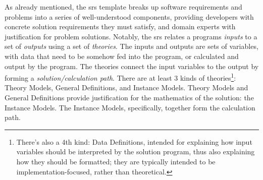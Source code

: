 As already mentioned, the \acs{srs} template \cite{SmithAndLai2005} breaks up
software requirements and problems into a series of well-understood components,
providing developers with concrete solution requirements they must satisfy, and
domain experts with justification for problem solutions. Notably, the \acs{srs}
relates a programs \textit{inputs} to a set of \textit{outputs} using a set of
\textit{theories}. The inputs and outputs are sets of variables, with data that
need to be somehow fed into the program, or calculated and output by the
program. The theories connect the input variables to the output by forming a
\textit{solution/calculation path}. There are at least 3 kinds of
theories\footnote{There's also a 4th kind: Data Definitions, intended for
explaining how input variables should be interpreted by the solution program,
thus also explaining how they should be formatted; they are typically intended
to be implementation-focused, rather than theoretical.}: Theory Models, General
Definitions, and Instance Models. Theory Models and General Definitions provide
justification for the mathematics of the solution: the Instance Models. The
Instance Models, specifically, together form the calculation path.

